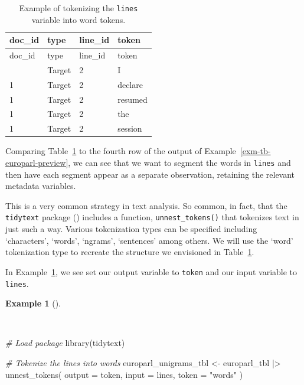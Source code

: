 \documentclass[
  letterpaper,
]{latex/krantz}
\newenvironment{Shaded}{\begin{snugshade}}{\end{snugshade}}
\newcommand{\AttributeTok}[1]{\textcolor[rgb]{0.00,0.00,0.00}{#1}}
\newcommand{\CommentTok}[1]{\textcolor[rgb]{0.00,0.00,0.00}{\textit{#1}}}
\newcommand{\FunctionTok}[1]{\textcolor[rgb]{0.00,0.00,0.00}{#1}}
\newcommand{\NormalTok}[1]{\textcolor[rgb]{0.00,0.00,0.00}{#1}}
\newcommand{\OtherTok}[1]{\textcolor[rgb]{0.00,0.00,0.00}{#1}}
\newcommand{\SpecialCharTok}[1]{\textcolor[rgb]{0.00,0.00,0.00}{#1}}
\newcommand{\StringTok}[1]{\textcolor[rgb]{0.00,0.00,0.00}{#1}}
\theoremstyle{definition}
\newtheorem{example}{Example}[chapter]
\theoremstyle{remark}
\begin{document}
\begin{longtable}[]{@{}llll@{}}
\caption{Example of tokenizing the \texttt{lines} variable into word
tokens.}\label{tbl-td-europarl-tokenization-words-example}\tabularnewline
\toprule\noalign{}
doc\_id & type & line\_id & token \\
\midrule\noalign{}
\endfirsthead
\toprule\noalign{}
doc\_id & type & line\_id & token \\
\midrule\noalign{}
\endhead
\bottomrule\noalign{}
\endlastfoot
1 & Target & 2 & I \\
1 & Target & 2 & declare \\
1 & Target & 2 & resumed \\
1 & Target & 2 & the \\
1 & Target & 2 & session \\
\end{longtable}

Comparing Table~\ref{tbl-td-europarl-tokenization-words-example} to the
fourth row of the output of Example~\ref{exm-tb-europarl-preview}, we
can see that we want to segment the words in \texttt{lines} and then
have each segment appear as a separate observation, retaining the
relevant metadata variables.

This is a very common strategy in text analysis. So common, in fact,
that the \texttt{tidytext} package () includes a function, \texttt{unnest\_tokens()} that
tokenizes text in just such a way. Various tokenization types can be
specified including `characters', `words', `ngrams', `sentences' among
others. We will use the `word' tokenization type to recreate the
structure we envisioned in
Table~\ref{tbl-td-europarl-tokenization-words-example}.

In Example~\ref{exm-td-europarl-tokenization-words-tidytext}, we see set
our output variable to \texttt{token} and our input variable to
\texttt{lines}.

\begin{example}[]\protect\hypertarget{exm-td-europarl-tokenization-words-tidytext}{}\label{exm-td-europarl-tokenization-words-tidytext}

~

\begin{Shaded}
\begin{Highlighting}[]
\CommentTok{\# Load package}
\FunctionTok{library}\NormalTok{(tidytext)}

\CommentTok{\# Tokenize the lines into words}
\NormalTok{europarl\_unigrams\_tbl }\OtherTok{\textless{}{-}}
\NormalTok{  europarl\_tbl }\SpecialCharTok{|\textgreater{}}
  \FunctionTok{unnest\_tokens}\NormalTok{(}
    \AttributeTok{output =}\NormalTok{ token,}
    \AttributeTok{input =}\NormalTok{ lines,}
    \AttributeTok{token =} \StringTok{"words"}
\NormalTok{  )}
\end{Highlighting}
\end{Shaded}

\end{example}
\end{document}
